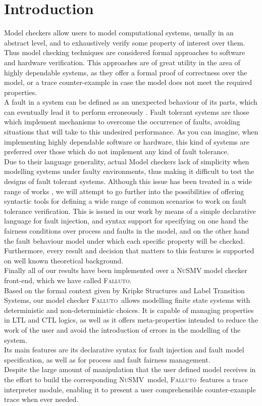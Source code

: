 \documentclass{llncs2e/llncs}
\newcommand{\nusmv}{\mbox{\textsc{NuSMV}}}
\newcommand{\nusmvSp}{\mbox{\textsc{NuSMV~}}}
\newcommand{\falluto}{\nohyphens{\textsc{Falluto}}}
\newcommand{\fallutoSp}{\nohyphens{\textsc{Falluto~}}}  %
\begin{document}
\section{Introduction}
Model checkers allow users to model computational systems, usually in an
abstract level, and to exhaustively verify some property of
interest over them. Thus model checking techniques are considered formal
approaches to software and hardware verification. This approaches are of great
utility in the area of highly dependable systems, as they offer a formal proof
of correctness over the model, or a trace counter-example in case the model
does not meet the required properties.\\
A fault in a system can be defined as an unexpected behaviour of its parts, which
can eventually lead it to perform erroneously \cite{jeffrey,felix}. Fault tolerant systems are those which implement mechanisms to overcome the occurrence of faults, avoiding situations
that will take to this undesired performance. As you can imagine, when
implementing highly dependable software or hardware, this kind of systems are
preferred over those which do not implement any kind of fault tolerance.\\
Due to their language generality, actual Model checkers lack of simplicity when
modelling systems under faulty environments, thus making it difficult to test
the designs of fault tolerant systems. Although this issue has been treated in a wide range of works \cite{tomoyuki,gnesi,bruns,schneider,annu,jonathan}, we will attempt to go further into the possibilities of offering syntactic tools for defining a wide range of common scenarios to work on fault tolerance verification. This is issued in our work by means of a simple
declarative language for fault injection, and syntax support for specifying
on one hand the fairness conditions over process and faults in the model, and 
on the other hand the fault behaviour model under which each specific property
will be checked. Furthermore, every result and decision that matters to this
features is supported on well known theoretical background.\\
Finally all of our results have been implemented over a
\nusmv\cite{cimatti} model checker front-end, which we have called \falluto.\\
Based on the formal context given by Kripke Structures and Label Transition 
Systems, our model checker \fallutoSp allows modelling finite
state systems with deterministic and non-deterministic choices. It is capable
of managing properties in LTL and CTL
logics, as well as it offers meta-properties intended to reduce the work of the
user and avoid the introduction of errors in the modelling of the system.\\
Its main features are its declarative syntax for fault injection and fault
model specification, as well as for process and fault fairness management.\\
Despite the large amount of manipulation that the user defined model receives
in the effort to build the corresponding \nusmvSp model,
\fallutoSp features a trace interpreter module, enabling it
to present a user comprehensible counter-example trace when ever needed.
\end{document}
